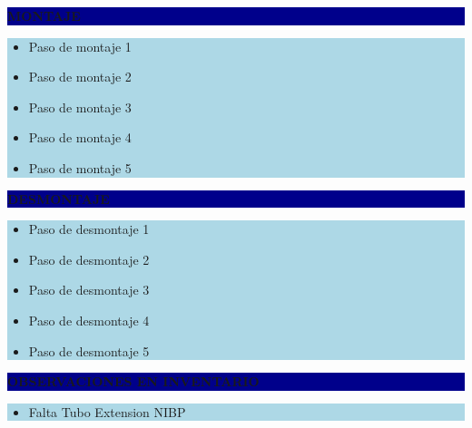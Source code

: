 \documentclass[11pt]{article}
\newcommand{\seccionbanda}[1]{%
  \vspace{0.6em}
  \noindent\colorbox{darkblue}{\parbox{\dimexpr\linewidth-2\fboxsep}{%
    \centering\color{white}\bfseries #1}}\par\vspace{0.6em}
}
\begin{document}
\seccionbanda{MONTAJE}
\noindent\colorbox{lightblue}{\parbox{\dimexpr\linewidth-2\fboxsep\relax}{%
\begin{itemize}[label=$\square$, itemsep=4pt]
\item Paso de montaje 1
\item Paso de montaje 2
\item Paso de montaje 3
\item Paso de montaje 4
\item Paso de montaje 5
\end{itemize}
}}\par

\seccionbanda{DESMONTAJE}
\noindent\colorbox{lightblue}{\parbox{\dimexpr\linewidth-2\fboxsep\relax}{%
\begin{itemize}[label=$\square$, itemsep=4pt]
\item Paso de desmontaje 1
\item Paso de desmontaje 2
\item Paso de desmontaje 3
\item Paso de desmontaje 4
\item Paso de desmontaje 5
\end{itemize}
}}\par
\seccionbanda{OBSERVACIONES EN INVENTARIO}
\noindent\colorbox{lightblue}{\parbox{\dimexpr\linewidth-2\fboxsep\relax}{\begin{itemize}[itemsep=4pt]
\item Falta Tubo Extension NIBP
\end{itemize}}}\par
\end{document}
